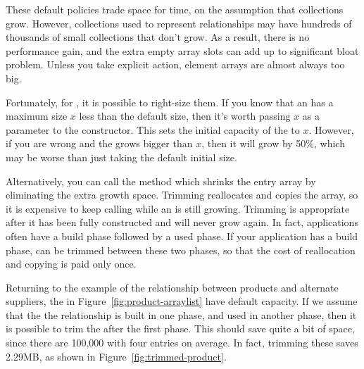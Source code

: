 These default policies trade space
for time, on the assumption that collections grow. However,
collections used to represent relationships may have hundreds of thousands of
small collections that don't grow. As a result, there is no performance gain, and the extra
empty array slots can add up to significant bloat problem. Unless you take explicit
action, element arrays are almost always too big.

 
 Fortunately, for , it is possible to right-size them. If you
 know that an  has a maximum size $x$ less than the default
 size, then it's worth passing $x$ as a parameter to the constructor. This sets the initial capacity of the
  to $x$. However, if you are wrong and the 
 grows bigger than $x$, then it will grow by 50\%, which may
 be worse than just taking the default initial size.
 
 Alternatively, you can call the  method which shrinks the
 entry array by eliminating the extra growth space. Trimming reallocates and
 copies the array, so it is expensive to keep calling  while an
  is still growing. Trimming is appropriate after
 it has been fully constructed and will never grow again. In fact, applications
 often have a build phase followed by a used phase. 
 If your application has a build phase,  can be trimmed
  between these two phases, so that the cost of reallocation and copying is
  paid only once.
 
 Returning to the example of the relationship between products and alternate
 suppliers, the  in Figure~\ref{fig:product-arraylist} have
  default capacity. If we assume that the the relationship is built in one
  phase, and used in another phase, then it is possible to trim the
   after the first phase. This should save quite a bit of
  space, since there are 100,000  with four entries on
  average. In fact, trimming these
  saves 2.29MB, as shown in
 Figure~\ref{fig:trimmed-product}. 


